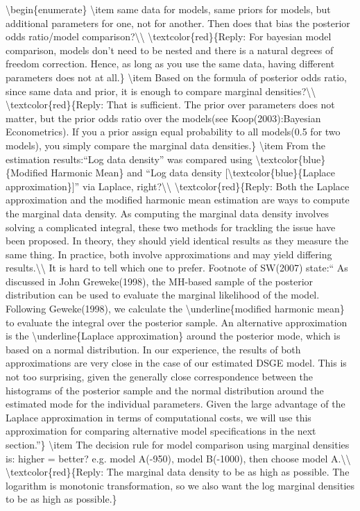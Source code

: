 \documentclass[10pt,math=newtx,citestyle=gb7714-2015,bibstyle=gb7714-2015]{elegantbook}
\begin{document}
	\textbackslash{}begin\{enumerate\}
	\textbackslash{}item same data for models, same priors for models, but additional parameters for one, not for another. Then does that bias the posterior odds ratio/model comparison?\textbackslash{}\textbackslash{}
	\textbackslash{}textcolor\{red\}\{Reply: For bayesian model comparison, models don't need to be nested and there is a natural degrees of freedom correction. Hence, as long as you use the same data, having different parameters does not at all.\}
	\textbackslash{}item Based on the formula of posterior odds ratio, since same data and prior, it is enough to compare marginal densities?\textbackslash{}\textbackslash{}
	\textbackslash{}textcolor\{red\}\{Reply: That is sufficient. The prior over parameters does not matter, but the prior odds ratio over the models(see Koop(2003):Bayesian Econometrics). If you a prior assign equal probability to all models(0.5 for two models), you simply compare the marginal data densities.\}
	\textbackslash{}item From the estimation results:``Log data density'' was compared using \textbackslash{}textcolor\{blue\}\{Modified Harmonic Mean\} and ``Log data density [\textbackslash{}textcolor\{blue\}\{Laplace approximation\}]'' via Laplace, right?\textbackslash{}\textbackslash{}
	\textbackslash{}textcolor\{red\}\{Reply: Both the Laplace approximation and the modified harmonic mean estimation are ways to compute the marginal data density. As computing the marginal data density involves solving a complicated integral, these two methods for trackling the issue have been proposed. In theory, they should yield identical results as they measure the same thing. In practice, both involve approximations and may yield differing results.\textbackslash{}\textbackslash{}
	It is hard to tell which one to prefer. Footnote of SW(2007) state:`` As discussed in John Greweke(1998), the MH-based sample of the posterior distribution can be used to evaluate the marginal likelihood of the model. Following Geweke(1998), we calculate the \textbackslash{}underline\{modified harmonic mean\} to evaluate the integral over the posterior sample. An alternative approximation is the \textbackslash{}underline\{Laplace approximation\} around the posterior mode, which is based on a normal distribution. In our experience, the results of both approximations are very close in the case of our estimated DSGE model. This is not too surprising, given the generally close correspondence between the histograms of the posterior sample and the normal distribution around the estimated mode for the individual parameters. Given the large advantage of the Laplace approximation in terms of computational costs, we will use this approximation for comparing alternative model specifications in the next section.''\}
	\textbackslash{}item The decision rule for model comparison using marginal densities is: higher = better? e.g. model A(-950), model B(-1000), then choose model A.\textbackslash{}\textbackslash{}
	\textbackslash{}textcolor\{red\}\{Reply: The marginal data density to be as high as possible. The logarithm is monotonic transformation, so we also want the log marginal densities to be as high as possible.\}
	
\end{document}
